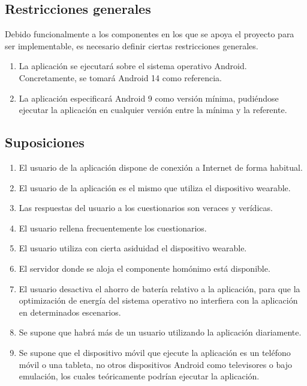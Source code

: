     \subsection{Restricciones generales}
        \label{req:descripcion:restricciones}
        Debido funcionalmente a los componentes en los que se apoya el proyecto para ser implementable, es necesario definir ciertas restricciones generales.
        \begin{enumerate}[label=\textbf{RG-\arabic*}]
            \item \label{req:restriccion:android_referencia} La aplicación se ejecutará sobre el sistema operativo Android. Concretamente, se tomará Android 14 como referencia.
            \item \label{req:restriccion:android_minimo} La aplicación especificará Android 9 como versión mínima, pudiéndose ejecutar la aplicación en cualquier versión entre la mínima y la referente.
        \end{enumerate}
    
    \subsection{Suposiciones}
        \label{req:descripcion:suposiciones}

        \begin{enumerate}[label=\textbf{SUP-\arabic*}]
            \item El usuario de la aplicación dispone de conexión a Internet de forma habitual.
            \item El usuario de la aplicación es el mismo que utiliza el dispositivo \gls{wearable}.
            \item Las respuestas del usuario a los cuestionarios son veraces y verídicas.
            \item El usuario rellena frecuentemente los cuestionarios.
            \item El usuario utiliza con cierta asiduidad el dispositivo \gls{wearable}.
            \item El servidor donde se aloja el componente homónimo está disponible.
            \item El usuario desactiva el ahorro de batería relativo a la aplicación, para que la optimización de energía del sistema operativo no interfiera con la aplicación en determinados escenarios.
            \item Se supone que habrá más de un usuario utilizando la aplicación diariamente.
            \item Se supone que el dispositivo móvil que ejecute la aplicación es un teléfono móvil o una tableta, no otros dispositivos Android como televisores o bajo emulación, los cuales teóricamente podrían ejecutar la aplicación.
        \end{enumerate}
        
